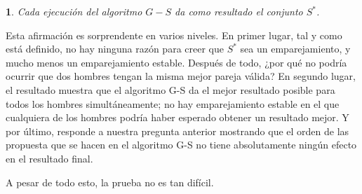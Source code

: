 \documentclass[a4paper, 12pt]{book}
\theoremstyle{dotless}
\newtheorem{theorem}{}%
\begin{document}
\vspace{2mm}\noindent
\colorbox{mygray}{\parbox{\textwidth}{
\begin{theorem}
Cada ejecución del algoritmo $G-S$ da como resultado el conjunto $S^*$.
\end{theorem}
}}
\vspace{2mm}

Esta afirmación es sorprendente en varios niveles. En primer lugar, tal y como está definido, no hay ninguna razón para creer que $S^*$ sea un emparejamiento, y mucho menos un emparejamiento estable. Después de todo, ¿por qué no podría ocurrir que dos hombres tengan la misma mejor pareja válida? En segundo lugar, el resultado muestra que el algoritmo G-S da el mejor resultado posible para todos los hombres simultáneamente; no hay emparejamiento estable en el que cualquiera de los hombres podría haber esperado obtener un resultado mejor. Y por último, responde a nuestra pregunta anterior mostrando que el orden de las propuesta que se hacen en el algoritmo G-S no tiene absolutamente ningún efecto en el resultado final.

A pesar de todo esto, la prueba no es tan difícil.
\end{document}
